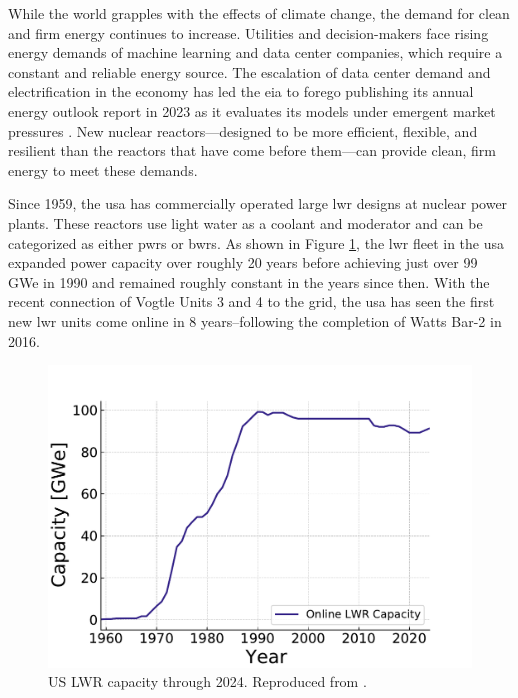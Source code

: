 While the world grapples with the effects of climate change, the demand for clean and firm energy continues to increase. Utilities and decision-makers face rising energy demands of machine learning and data center companies, which require a constant and reliable energy source. The escalation of data center demand and electrification in the economy has led the \gls{eia} to forego publishing its annual energy outlook report in 2023 as it evaluates its models under emergent market pressures \cite{eia_annual_outlook_canceled_2023}. New nuclear reactors---designed to be more efficient, flexible, and resilient than the reactors that have come before them---can provide clean, firm energy to meet these demands.

Since 1959, the \gls{usa} has commercially operated large \gls{lwr} designs at
nuclear power plants. These reactors use light water as a coolant and moderator
and can be categorized as either \glspl{pwr} or \glspl{bwr}. As shown in Figure
\ref{fig:online_lwr_cap_2024}, the \gls{lwr} fleet in the \gls{usa} expanded power capacity over roughly 20 years before achieving just over 99 GWe in
1990 and remained roughly constant in the years since then. With the recent
connection of Vogtle Units 3 and 4 to the grid, the \gls{usa} has seen the
first new \gls{lwr} units come online in 8 years--following the completion of
Watts Bar-2 in 2016.

\begin{figure}[H]
    \centering
    \includegraphics[scale=0.7]{images/intro/online_lwr_cap_2024.pdf}
    \caption{US LWR capacity through 2024. Reproduced from \cite{IAEA_PRIS}.}
    \label{fig:online_lwr_cap_2024}
\end{figure}

